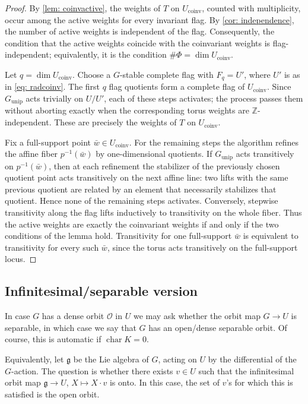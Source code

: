 \documentclass[12pt]{article}
\newcommand{\Z}{\mathbb{Z}}
\newcommand{\Lieg}{\mathfrak{g}}
\newcommand{\rad}[1]{#1_{\operatorname{unip}}}
\newcommand{\orbit}{\mathcal{O}}
\newcommand{\chr}{\operatorname{char}}
\newcommand{\coinv}{\operatorname{coinv}}
\begin{document}
\begin{proof}
By \cref{lem: coinvactive}, the weights of $T$ on $U_{\coinv}$, counted with multiplicity, occur among the active weights for every invariant flag.
By \cref{cor: independence}, the number of active weights is independent of the flag. Consequently, the condition that the active weights coincide with the coinvariant weights is flag-independent;
equivalently, it is the condition $\#\Phi=\dim U_{\coinv}$.



Let $q=\dim U_{\coinv}$.
Choose a $G$-stable complete flag with $F_q=U'$, where $U'$ is as in \cref{eq: radcoinv}.
The first $q$ flag quotients form a complete flag of $U_{\coinv}$.  Since $\rad{G}$ acts trivially on
$U/U'$, each of these steps activates; the process passes them without aborting exactly
when the corresponding torus weights are $\Z$-independent.  These are precisely
the weights of $T$ on $U_{\coinv}$.

Fix a full-support point $\bar w\in U_{\coinv}$.  For the remaining steps the
algorithm refines the affine fiber $p^{-1}(\bar w)$ by one-dimensional quotients.  If
$\rad{G}$ acts transitively on $p^{-1}(\bar w)$, then at each refinement the
stabilizer of the previously chosen quotient point acts transitively on the next affine
line: two lifts with the same previous quotient are related by an element that necessarily
stabilizes that quotient.  Hence none of the remaining steps activates.  Conversely,
stepwise transitivity along the flag lifts inductively to transitivity on the whole fiber.
Thus the active weights are exactly the coinvariant weights if and only if the two conditions of the lemma hold.
Transitivity for one full-support $\bar w$ is equivalent to transitivity
for every such $\bar w$, since the torus acts transitively on the full-support locus.
\end{proof}

\subsection{Infinitesimal/separable version}

In case $G$ has a dense orbit $\orbit$ in $U$
we may ask whether the orbit map $G\rightarrow U$ is separable, in which case we say that $G$ has an open/dense separable orbit.
Of course, this is automatic if $\chr K=0$.

Equivalently, let $\Lieg$ be the Lie algebra of $G$, acting on $U$ by the differential of the $G$-action.
The question is whether there exists $v\in U$ such that the infinitesimal orbit map
$\Lieg\rightarrow U$, $X\mapsto X\cdot v$ is onto. In this case, the set of $v$'s for which this is satisfied is the open orbit.
\end{document}
